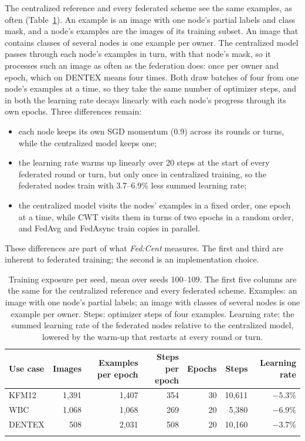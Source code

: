 \documentclass[pdflatex,sn-mathphys-num]{sn-jnl}
\newcommand{\fedcent}{\textit{Fed:Cent}}
\begin{document}
The centralized reference and every federated scheme see the same examples, as often (Table~\ref{tab:exposure}). An example is an image with one node's partial labels and class mask, and a node's examples are the images of its training subset. An image that contains classes of several nodes is one example per owner. The centralized model passes through each node's examples in turn, with that node's mask, so it processes such an image as often as the federation does: once per owner and epoch, which on DENTEX means four times. Both draw batches of four from one node's examples at a time, so they take the same number of optimizer steps, and in both the learning rate decays linearly with each node's progress through its own epochs. Three differences remain:
\begin{itemize}
\item each node keeps its own SGD momentum (0.9) across its rounds or turns, while the centralized model keeps one;
\item the learning rate warms up linearly over 20 steps at the start of every federated round or turn, but only once in centralized training, so the federated nodes train with 3.7--6.9\% less summed learning rate;
\item the centralized model visits the nodes' examples in a fixed order, one epoch at a time, while CWT visits them in turns of two epochs in a random order, and FedAvg and FedAsync train copies in parallel.
\end{itemize}
These differences are part of what \fedcent{} measures. The first and third are inherent to federated training; the second is an implementation choice.

\begin{table}[t]
\caption{Training exposure per seed, mean over seeds 100--109. The first five columns are the same for the centralized reference and every federated scheme. Examples: an image with one node's partial labels; an image with classes of several nodes is one example per owner. Steps: optimizer steps of four examples. Learning rate: the summed learning rate of the federated nodes relative to the centralized model, lowered by the warm-up that restarts at every round or turn.}\label{tab:exposure}
\footnotesize
\begin{tabular*}{\textwidth}{@{\extracolsep\fill}lrrrrrr}
\toprule
Use case & Images & Examples per epoch & Steps per epoch & Epochs & Steps & Learning rate \\
\midrule
KFM12 & 1,391 & 1,407 & 354 & 30 & 10,611 & $-5.3\%$ \\
WBC & 1,068 & 1,068 & 269 & 20 & 5,380 & $-6.9\%$ \\
DENTEX & 508 & 2,031 & 508 & 20 & 10,160 & $-3.7\%$ \\
\botrule
\end{tabular*}
\end{table}
\end{document}
